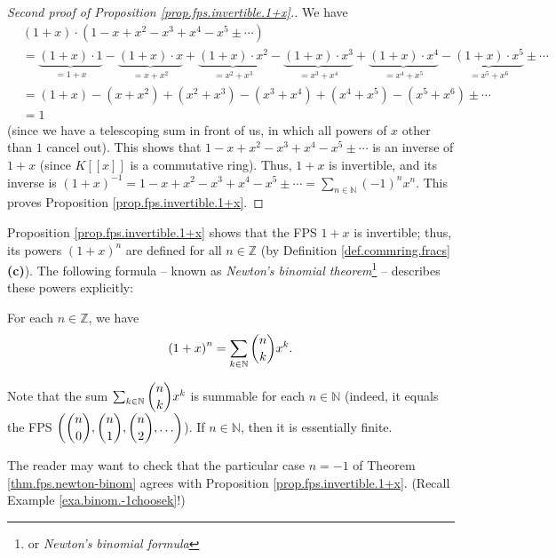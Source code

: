 \begin{proof}
[Second proof of Proposition \ref{prop.fps.invertible.1+x}.]We have%
\begin{align*}
&  \left(  1+x\right)  \cdot\left(  1-x+x^{2}-x^{3}+x^{4}-x^{5}\pm
\cdots\right) \\
&  =\underbrace{\left(  1+x\right)  \cdot1}_{=1+x}-\underbrace{\left(
1+x\right)  \cdot x}_{=x+x^{2}}+\underbrace{\left(  1+x\right)  \cdot x^{2}%
}_{=x^{2}+x^{3}}-\underbrace{\left(  1+x\right)  \cdot x^{3}}_{=x^{3}+x^{4}%
}+\underbrace{\left(  1+x\right)  \cdot x^{4}}_{=x^{4}+x^{5}}%
-\underbrace{\left(  1+x\right)  \cdot x^{5}}_{=x^{5}+x^{6}}\pm\cdots\\
&  =\left(  1+x\right)  -\left(  x+x^{2}\right)  +\left(  x^{2}+x^{3}\right)
-\left(  x^{3}+x^{4}\right)  +\left(  x^{4}+x^{5}\right)  -\left(  x^{5}%
+x^{6}\right)  \pm\cdots\\
&  =1
\end{align*}
(since we have a telescoping sum in front of us, in which all powers of $x$
other than $1$ cancel out). This shows that $1-x+x^{2}-x^{3}+x^{4}-x^{5}%
\pm\cdots$ is an inverse of $1+x$ (since $K\left[  \left[  x\right]  \right]
$ is a commutative ring). Thus, $1+x$ is invertible, and its inverse is
$\left(  1+x\right)  ^{-1}=1-x+x^{2}-x^{3}+x^{4}-x^{5}\pm\cdots=\sum
_{n\in\mathbb{N}}\left(  -1\right)  ^{n}x^{n}$. This proves Proposition
\ref{prop.fps.invertible.1+x}.
\end{proof}

Proposition \ref{prop.fps.invertible.1+x} shows that the FPS $1+x$ is
invertible; thus, its powers $\left(  1+x\right)  ^{n}$ are defined for all
$n\in\mathbb{Z}$ (by Definition \ref{def.commring.fracs} \textbf{(c)}). The
following formula -- known as \emph{Newton's binomial theorem}\footnote{or
\emph{Newton's binomial formula}} -- describes these powers explicitly:

\begin{theorem}
\label{thm.fps.newton-binom}For each $n\in\mathbb{Z}$, we have%
\[
\left(  1+x\right)  ^{n}=\sum_{k\in\mathbb{N}}\dbinom{n}{k}x^{k}.
\]

\end{theorem}

Note that the sum $\sum_{k\in\mathbb{N}}\dbinom{n}{k}x^{k}$ is summable for
each $n\in\mathbb{N}$ (indeed, it equals the FPS $\left(  \dbinom{n}%
{0},\dbinom{n}{1},\dbinom{n}{2},\ldots\right)  $). If $n\in\mathbb{N}$, then
it is essentially finite.

The reader may want to check that the particular case $n=-1$ of Theorem
\ref{thm.fps.newton-binom} agrees with Proposition
\ref{prop.fps.invertible.1+x}. (Recall Example \ref{exa.binom.-1choosek}!)

